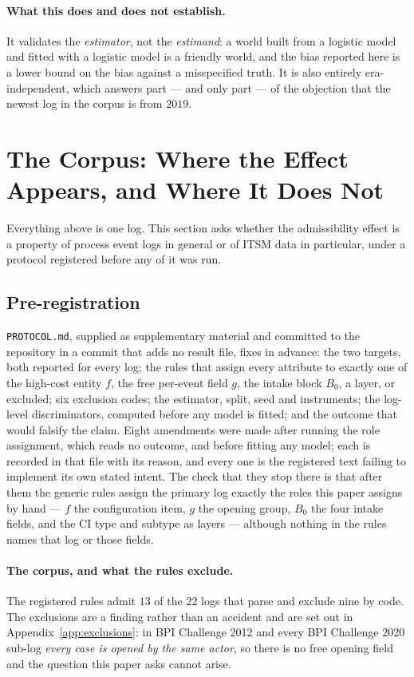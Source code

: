 \documentclass[preprint,12pt]{elsarticle}
\begin{document}
\paragraph{What this does and does not establish.} It validates the
\emph{estimator}, not the \emph{estimand}: a world built from a logistic model
and fitted with a logistic model is a friendly world, and the bias reported
here is a lower bound on the bias against a misspecified truth. It is also
entirely era-independent, which answers part --- and only part --- of the
objection that the newest log in the corpus is from $2019$.

\section{The Corpus: Where the Effect Appears, and Where It Does Not}
\label{sec:corpus}

Everything above is one log. This section asks whether the admissibility
effect is a property of process event logs in general or of ITSM data in
particular, under a protocol registered before any of it was run.

\subsection{Pre-registration}
\texttt{PROTOCOL.md}, supplied as supplementary material and committed to the
repository in a commit that adds no result file, fixes in advance: the two
targets, both reported for every log; the rules that assign every attribute to
exactly one of the high-cost entity $f$, the free per-event field $g$, the
intake block $B_0$, a layer, or excluded; six exclusion codes; the estimator,
split, seed and instruments; the log-level discriminators, computed before any
model is fitted; and the outcome that would falsify the claim. Eight
amendments were made after running the role assignment, which reads no
outcome, and before fitting any model; each is recorded in that file with its
reason, and every one is the registered text failing to implement its own
stated intent. The check that they stop there is that after them the generic
rules assign the primary log exactly the roles this paper assigns by hand ---
$f$ the configuration item, $g$ the opening group, $B_0$ the four intake
fields, and the CI type and subtype as layers --- although nothing in the
rules names that log or those fields.

\paragraph{The corpus, and what the rules exclude.}
The registered rules admit $13$ of the $22$ logs that parse and exclude nine by code. The exclusions are a finding rather than an accident and are set out in Appendix~\ref{app:exclusions}: in BPI Challenge 2012 and every BPI Challenge 2020 sub-log \emph{every case is opened by the same actor}, so there is no free opening field and the question this paper asks cannot arise.
\end{document}
